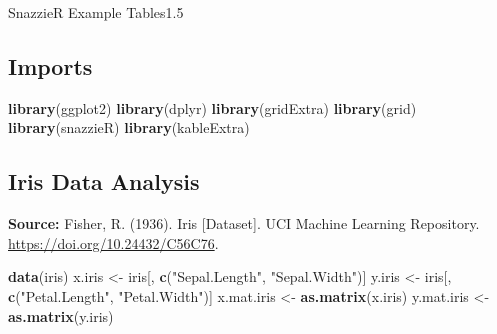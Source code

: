 \documentclass[
]{article}
\author{}
\date{\vspace{-2.5em}}
\makeatletter
\newenvironment{Shaded}{\begin{snugshade}}{\end{snugshade}}
\newcommand{\FunctionTok}[1]{\textcolor[rgb]{0.13,0.29,0.53}{\textbf{#1}}}
\newcommand{\NormalTok}[1]{#1}
\newcommand{\OtherTok}[1]{\textcolor[rgb]{0.56,0.35,0.01}{#1}}
\newcommand{\StringTok}[1]{\textcolor[rgb]{0.31,0.60,0.02}{#1}}
\newcommand{\headertext}{}
\newlength{\headertextwidth}
\newcommand{\autoscaleheader}[1]{%
    \settowidth{\headertextwidth}{#1}%
    \ifdim\headertextwidth>0.55\textwidth
        \renewcommand{\headertext}{\scalebox{0.85}{#1}}%
        \fancyhead[L]{}%
    \else
        \renewcommand{\headertext}{#1}%
        \fancyhead[L]{\today}%
    \fi
}
\newcommand{\@UNsection}[2]{%
    \section{\scalebox{#2}[#2]{#1}}%
    \markboth{\normalsize #1}{}%
    \autoscaleheader{{\normalsize #1 \quad - \quad}}%
    \ifnum\value{page}=1\else
        \fancyhead[C]{\headertext}%
        \thispagestyle{fancy}%
    \fi
}
\newcommand{\UNsection}{%
    \@ifnextchar\bgroup
        {\@UNsectionWithScale}
        {\@UNsectionDefault}
}
\newcommand{\@UNsectionWithScale}[1]{%
    \@ifnextchar\bgroup
        {\@UNsectionWithScaleAndTitle{#1}}
        {\@UNsection{#1}{1.0}}%
}
\newcommand{\@UNsectionWithScaleAndTitle}[2]{%
    \@UNsection{#1}{#2}%
}
\newcommand{\@UNsectionDefault}[1]{%
    \@UNsection{#1}{1.0}%
}
\makeatother
\begin{document}
\thispagestyle{firstpage}
\UNsection{SnazzieR Example Tables}{1.5}

\subsection{Imports}\label{imports}

\begin{Shaded}
\begin{Highlighting}[]
\FunctionTok{library}\NormalTok{(ggplot2)}
\FunctionTok{library}\NormalTok{(dplyr)}
\FunctionTok{library}\NormalTok{(gridExtra)}
\FunctionTok{library}\NormalTok{(grid)}
\FunctionTok{library}\NormalTok{(snazzieR)}
\FunctionTok{library}\NormalTok{(kableExtra)}
\end{Highlighting}
\end{Shaded}

\subsection{Iris Data Analysis}\label{iris-data-analysis}

\textbf{Source:} Fisher, R. (1936). Iris {[}Dataset{]}. UCI Machine
Learning Repository. \url{https://doi.org/10.24432/C56C76}.

\begin{Shaded}
\begin{Highlighting}[]
\FunctionTok{data}\NormalTok{(iris)}
\NormalTok{x.iris }\OtherTok{\textless{}{-}}\NormalTok{ iris[, }\FunctionTok{c}\NormalTok{(}\StringTok{"Sepal.Length"}\NormalTok{, }\StringTok{"Sepal.Width"}\NormalTok{)]}
\NormalTok{y.iris }\OtherTok{\textless{}{-}}\NormalTok{ iris[, }\FunctionTok{c}\NormalTok{(}\StringTok{"Petal.Length"}\NormalTok{, }\StringTok{"Petal.Width"}\NormalTok{)]}
\NormalTok{x.mat.iris }\OtherTok{\textless{}{-}} \FunctionTok{as.matrix}\NormalTok{(x.iris)}
\NormalTok{y.mat.iris }\OtherTok{\textless{}{-}} \FunctionTok{as.matrix}\NormalTok{(y.iris)}
\end{Highlighting}
\end{Shaded}
\end{document}
